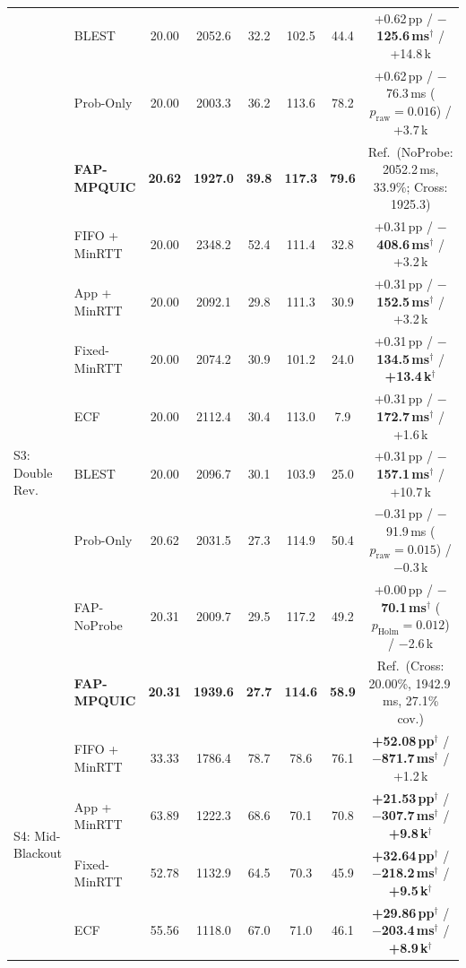 \documentclass[preprint,12pt,number]{elsarticle}
\begin{document}
\begin{table}[t]
{\begin{tabular}{@{}llcccccc@{}}
& BLEST~\cite{ferlin2016blest} & 20.00 & 2052.6 & 32.2 & 102.5 & 44.4 & +0.62\,pp / \textbf{$-$125.6\,ms}$^\dagger$ / +14.8\,k \\
& Prob-Only & 20.00 & 2003.3 & 36.2 & 113.6 & 78.2 & +0.62\,pp / $-$76.3\,ms ($p_{\text{raw}}{=}0.016$) / +3.7\,k \\
& \textbf{FAP-MPQUIC} & \textbf{20.62} & \textbf{1927.0} & \textbf{39.8} & \textbf{117.3} & \textbf{79.6} & Ref.\ (NoProbe: 2052.2\,ms, 33.9\%; Cross: 1925.3) \\
\midrule
\multirow{8}{*}{S3: Double Rev.}
& FIFO + MinRTT & 20.00 & 2348.2 & 52.4 & 111.4 & 32.8 & +0.31\,pp / \textbf{$-$408.6\,ms}$^\dagger$ / +3.2\,k \\
& App + MinRTT & 20.00 & 2092.1 & 29.8 & 111.3 & 30.9 & +0.31\,pp / \textbf{$-$152.5\,ms}$^\dagger$ / +3.2\,k \\
& Fixed-MinRTT & 20.00 & 2074.2 & 30.9 & 101.2 & 24.0 & +0.31\,pp / \textbf{$-$134.5\,ms}$^\dagger$ / \textbf{+13.4\,k}$^\dagger$ \\
& ECF~\cite{lim2017ecf} & 20.00 & 2112.4 & 30.4 & 113.0 & 7.9 & +0.31\,pp / \textbf{$-$172.7\,ms}$^\dagger$ / +1.6\,k \\
& BLEST~\cite{ferlin2016blest} & 20.00 & 2096.7 & 30.1 & 103.9 & 25.0 & +0.31\,pp / \textbf{$-$157.1\,ms}$^\dagger$ / +10.7\,k \\
& Prob-Only & 20.62 & 2031.5 & 27.3 & 114.9 & 50.4 & $-$0.31\,pp / $-$91.9\,ms ($p_{\text{raw}}{=}0.015$) / $-$0.3\,k \\
& FAP-NoProbe & 20.31 & 2009.7 & 29.5 & 117.2 & 49.2 & +0.00\,pp / \textbf{$-$70.1\,ms}$^\dagger$ ($p_{\text{Holm}}{=}0.012$) / $-$2.6\,k \\
& \textbf{FAP-MPQUIC} & \textbf{20.31} & \textbf{1939.6} & \textbf{27.7} & \textbf{114.6} & \textbf{58.9} & Ref.\ (Cross: 20.00\%, 1942.9\,ms, 27.1\% cov.) \\
\midrule
\multirow{7}{*}{S4: Mid-Blackout}
& FIFO + MinRTT & 33.33 & 1786.4 & 78.7 & 78.6 & 76.1 & \textbf{+52.08\,pp}$^\dagger$ / \textbf{$-$871.7\,ms}$^\dagger$ / +1.2\,k \\
& App + MinRTT & 63.89 & 1222.3 & 68.6 & 70.1 & 70.8 & \textbf{+21.53\,pp}$^\dagger$ / \textbf{$-$307.7\,ms}$^\dagger$ / \textbf{+9.8\,k}$^\dagger$ \\
& Fixed-MinRTT & 52.78 & 1132.9 & 64.5 & 70.3 & 45.9 & \textbf{+32.64\,pp}$^\dagger$ / \textbf{$-$218.2\,ms}$^\dagger$ / \textbf{+9.5\,k}$^\dagger$ \\
& ECF~\cite{lim2017ecf} & 55.56 & 1118.0 & 67.0 & 71.0 & 46.1 & \textbf{+29.86\,pp}$^\dagger$ / \textbf{$-$203.4\,ms}$^\dagger$ / \textbf{+8.9\,k}$^\dagger$ \\

\end{tabular}}
\end{table}
\end{document}
